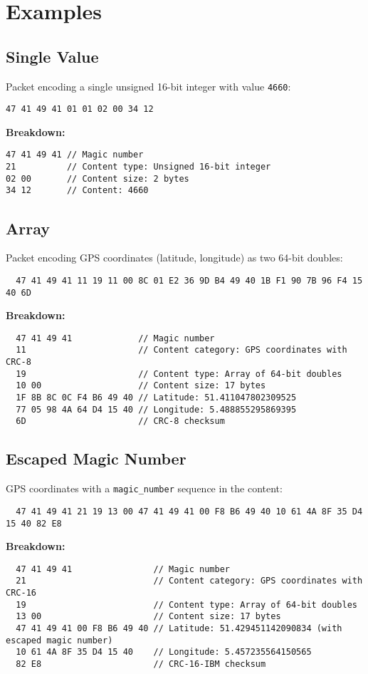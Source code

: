 \documentclass[a4paper]{article}
\begin{document}
\section{Examples}
\subsection{Single Value}
Packet encoding a single unsigned 16-bit integer with value \texttt{4660}:
\begin{verbatim}
47 41 49 41 01 01 02 00 34 12
\end{verbatim}
\textbf{Breakdown:}
\begin{verbatim}
47 41 49 41 // Magic number
21          // Content type: Unsigned 16-bit integer
02 00       // Content size: 2 bytes
34 12       // Content: 4660
\end{verbatim}

\subsection{Array}
Packet encoding GPS coordinates (latitude, longitude) as two 64-bit doubles:
\begin{verbatim}
  47 41 49 41 11 19 11 00 8C 01 E2 36 9D B4 49 40 1B F1 90 7B 96 F4 15 40 6D
\end{verbatim}
\textbf{Breakdown:}
\begin{verbatim}
  47 41 49 41             // Magic number
  11                      // Content category: GPS coordinates with CRC-8
  19                      // Content type: Array of 64-bit doubles
  10 00                   // Content size: 17 bytes
  1F 8B 8C 0C F4 B6 49 40 // Latitude: 51.411047802309525
  77 05 98 4A 64 D4 15 40 // Longitude: 5.488855295869395
  6D                      // CRC-8 checksum
\end{verbatim}

\subsection{Escaped Magic Number}
GPS coordinates with a \texttt{magic\_number} sequence in the content:
\begin{verbatim}
  47 41 49 41 21 19 13 00 47 41 49 41 00 F8 B6 49 40 10 61 4A 8F 35 D4 15 40 82 E8
\end{verbatim}
\textbf{Breakdown:}
\begin{verbatim}
  47 41 49 41                // Magic number
  21                         // Content category: GPS coordinates with CRC-16
  19                         // Content type: Array of 64-bit doubles
  13 00                      // Content size: 17 bytes
  47 41 49 41 00 F8 B6 49 40 // Latitude: 51.429451142090834 (with escaped magic number)
  10 61 4A 8F 35 D4 15 40    // Longitude: 5.457235564150565
  82 E8                      // CRC-16-IBM checksum
\end{verbatim}
\end{document}
